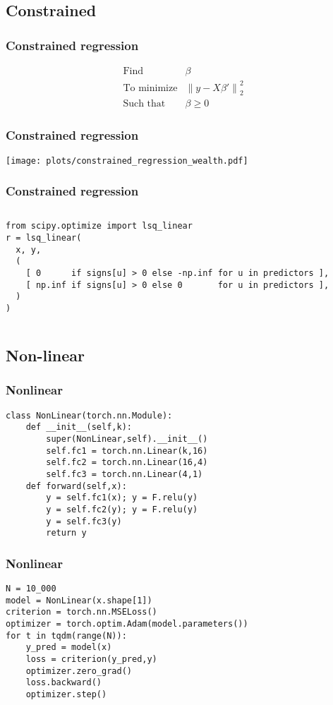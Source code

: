 \documentclass[a4paper,12pt,compress,serif]{beamer}
\def\n#1{\left\|#1\right\|}
\let\geq\geqslant
\begin{document}
\subsection{Constrained}
\frame{\tableofcontents[currentsubsection]}
\begin{frame}
  \frametitle{Constrained regression}
  \[
  \begin{array}{ll}
    \text{Find} & \beta \\
    \text{To minimize} & \n{ y - X \beta ' }_2^2 \\
    \text{Such that} & \beta \geq 0
  \end{array}
  \]
\end{frame}

\begin{frame}
  \frametitle{Constrained regression}  
  \texttt{[image: plots/constrained\_regression\_wealth.pdf]}
\end{frame}

\begin{frame}[fragile]
  \frametitle{Constrained regression}
  \begin{columns}
    \column{\dimexpr\paperwidth-30pt}
\begin{verbatim}
from scipy.optimize import lsq_linear
r = lsq_linear(
  x, y,
  (
    [ 0      if signs[u] > 0 else -np.inf for u in predictors ],
    [ np.inf if signs[u] > 0 else 0       for u in predictors ],
  )
)    
\end{verbatim}
  \end{columns}
\end{frame}

\subsection{Non-linear}
\frame{\tableofcontents[currentsubsection]}
\begin{frame}[fragile]
  \frametitle{Nonlinear}
\begin{verbatim}
class NonLinear(torch.nn.Module):
    def __init__(self,k):
        super(NonLinear,self).__init__()
        self.fc1 = torch.nn.Linear(k,16)
        self.fc2 = torch.nn.Linear(16,4)
        self.fc3 = torch.nn.Linear(4,1)
    def forward(self,x):
        y = self.fc1(x); y = F.relu(y)
        y = self.fc2(y); y = F.relu(y)
        y = self.fc3(y)
        return y
\end{verbatim}
\end{frame}

\begin{frame}[fragile]
  \frametitle{Nonlinear}
\begin{verbatim}    
N = 10_000
model = NonLinear(x.shape[1])
criterion = torch.nn.MSELoss()
optimizer = torch.optim.Adam(model.parameters())
for t in tqdm(range(N)):
    y_pred = model(x)
    loss = criterion(y_pred,y)
    optimizer.zero_grad()
    loss.backward()
    optimizer.step()
\end{verbatim}
\end{frame}
\end{document}
